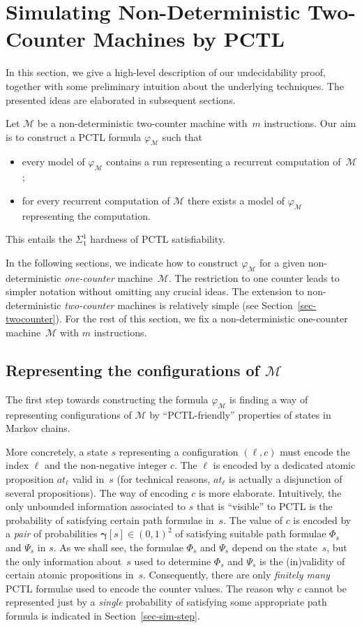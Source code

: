 \documentclass[a4paper,UKenglish,cleveref, autoref, thm-restate]{lipics-v2021}
\newcommand{\M}{\mathcal{M}}
\newcommand{\at}{\mathit{at}}
\renewcommand{\vec}[1]{\pmb{#1}}
\newcommand{\cv}{\vec{\gamma}}
\newcommand*{\vp}{\varphi}
\begin{document}
 \section{Simulating Non-Deterministic Two-Counter Machines by PCTL}
\label{sec-simulate}

In this section, we give a high-level description of our undecidability proof, together with some preliminary intuition about the underlying techniques. The presented ideas are elaborated in subsequent sections.

Let $\M$ be a non-deterministic two-counter machine with~$m$ instructions. Our aim is to construct a PCTL formula $\vp_\M$ such that 
\begin{itemize}
    \item every model of $\vp_\M$ contains a run representing a recurrent computation of~$\M$;
    \item for every recurrent computation of $\M$ there exists a model of $\vp_\M$ representing the computation.
\end{itemize}
This entails the $\Sigma_1^1$ hardness of PCTL satisfiability. 

In the following sections, we indicate how to construct $\varphi_\M$ for a given non-deterministic \emph{one-counter} machine~$\M$. The restriction to one counter  leads to simpler notation without omitting any crucial ideas. The extension to non-deterministic \emph{two-counter} machines is relatively simple (see Section~\ref{sec-twocounter}).
For the rest of this section, we fix a non-deterministic one-counter machine~$\M$ with $m$ instructions.

\subsection{Representing the configurations of $\M$}
\label{sec-conf-repre}
The first step towards constructing the formula $\vp_\M$ is finding a way of representing configurations of $\M$ by ``PCTL-friendly'' properties of states in Markov chains.

More concretely, a state $s$ representing a configuration $(\ell,c)$ must encode the index $\ell$ and the non-negative integer $c$. The  $\ell$ is encoded by a dedicated atomic proposition $\at_\ell$ valid in~$s$ (for technical reasons, $\at_\ell$ is actually a disjunction of several propositions). The way of encoding $c$ is more elaborate. Intuitively, the only unbounded information associated to $s$ that is ``visible'' to PCTL is the probability of satisfying certain path formulae in~$s$. The value of $c$ is encoded by a \emph{pair} of probabilities $\cv[s] \in (0,1)^2$ of satisfying suitable path formulae $\Phi_s$ and $\Psi_s$ in $s$. As we shall see, the formulae $\Phi_s$ and $\Psi_s$ depend on the state~$s$, but the only information about~$s$ used to determine $\Phi_s$ and $\Psi_s$ is the (in)validity of certain atomic propositions in~$s$. Consequently, there are only \emph{finitely many} PCTL formulae used to encode the counter values. The reason why $c$ cannot be represented just by a \emph{single} probability of satisfying some appropriate path formula is indicated in Section~\ref{sec-sim-step}.
\end{document}
